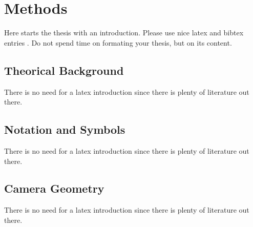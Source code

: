\chapter{Methods}
\label{chapter:Methods}



Here starts the thesis with an introduction. Please use nice latex and bibtex entries \cite{latex}. Do not spend time on formating your thesis, but on its content. 
 
\section{Theorical Background}
There is no need for a latex introduction since there is plenty of literature out there.
 

\section{Notation and Symbols}
There is no need for a latex introduction since there is plenty of literature out there.


\section{Camera Geometry}
There is no need for a latex introduction since there is plenty of literature out there.

